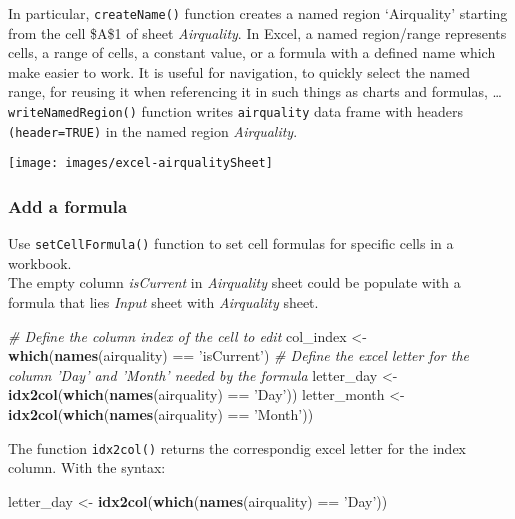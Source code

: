 \documentclass[]{book}
\newenvironment{Shaded}{\begin{snugshade}}{\end{snugshade}}
\newcommand{\KeywordTok}[1]{\textcolor[rgb]{0.13,0.29,0.53}{\textbf{{#1}}}}
\newcommand{\StringTok}[1]{\textcolor[rgb]{0.31,0.60,0.02}{{#1}}}
\newcommand{\CommentTok}[1]{\textcolor[rgb]{0.56,0.35,0.01}{\textit{{#1}}}}
\newcommand{\NormalTok}[1]{{#1}}
\begin{document}
In particular, \texttt{createName()} function creates a named region
`Airquality' starting from the cell \$A\$1 of sheet \emph{Airquality}.
In Excel, a named region/range represents cells, a range of cells, a
constant value, or a formula with a defined name which make easier to
work. It is useful for navigation, to quickly select the named range,
for reusing it when referencing it in such things as charts and
formulas, \ldots{}\\
\texttt{writeNamedRegion()} function writes \texttt{airquality} data
frame with headers \texttt{(header=TRUE)} in the named region
\emph{Airquality}.

\texttt{[image: images/excel-airqualitySheet]}

\subsubsection{Add a formula}\label{add-a-formula}

Use \texttt{setCellFormula()} function to set cell formulas for specific
cells in a workbook.\\
The empty column \emph{isCurrent} in \emph{Airquality} sheet could be
populate with a formula that lies \emph{Input} sheet with
\emph{Airquality} sheet.

\begin{Shaded}
\begin{Highlighting}[]
\CommentTok{# Define the column index of the cell to edit}
\NormalTok{col_index <-}\StringTok{ }\KeywordTok{which}\NormalTok{(}\KeywordTok{names}\NormalTok{(airquality) ==}\StringTok{ 'isCurrent'}\NormalTok{)}
\CommentTok{# Define the excel letter for the column 'Day' and 'Month' needed by the formula }
\NormalTok{letter_day <-}\StringTok{ }\KeywordTok{idx2col}\NormalTok{(}\KeywordTok{which}\NormalTok{(}\KeywordTok{names}\NormalTok{(airquality) ==}\StringTok{ 'Day'}\NormalTok{))}
\NormalTok{letter_month <-}\StringTok{ }\KeywordTok{idx2col}\NormalTok{(}\KeywordTok{which}\NormalTok{(}\KeywordTok{names}\NormalTok{(airquality) ==}\StringTok{ 'Month'}\NormalTok{))}
\end{Highlighting}
\end{Shaded}

The function \texttt{idx2col()} returns the correspondig excel letter
for the index column. With the syntax:

\begin{Shaded}
\begin{Highlighting}[]
\NormalTok{letter_day <-}\StringTok{ }\KeywordTok{idx2col}\NormalTok{(}\KeywordTok{which}\NormalTok{(}\KeywordTok{names}\NormalTok{(airquality) ==}\StringTok{ 'Day'}\NormalTok{))}
\end{Highlighting}
\end{Shaded}
\end{document}

